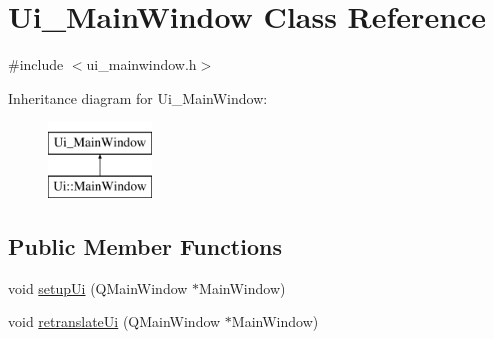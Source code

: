 \hypertarget{class_ui___main_window}{\section{\-Ui\-\_\-\-Main\-Window \-Class \-Reference}
\label{class_ui___main_window}
}


{\ttfamily \#include $<$ui\-\_\-mainwindow.\-h$>$}

\-Inheritance diagram for \-Ui\-\_\-\-Main\-Window\-:\begin{figure}[H]
\begin{center}
\leavevmode
\includegraphics[height=2.000000cm]{class_ui___main_window}
\end{center}
\end{figure}
\subsection*{\-Public \-Member \-Functions}
\begin{DoxyCompactItemize}
\item 
void \hyperlink{class_ui___main_window_acf4a0872c4c77d8f43a2ec66ed849b58}{setup\-Ui} (\-Q\-Main\-Window $\ast$\-Main\-Window)
\item 
void \hyperlink{class_ui___main_window_a097dd160c3534a204904cb374412c618}{retranslate\-Ui} (\-Q\-Main\-Window $\ast$\-Main\-Window)
\end{DoxyCompactItemize}

